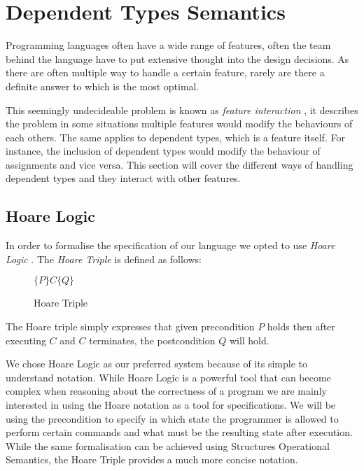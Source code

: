 \documentclass[a4paper,12pt]{report}
\begin{document}
\section{Dependent Types Semantics}
Programming languages often have a wide range of features, often the team behind 
the language have to put extensive thought into the design decisions. As there 
are often multiple way to handle a certain feature, rarely are there a definite 
answer to which is the most optimal.

\par
This seemingly undecideable problem is known as \textit{feature interaction} 
\cite{featInteract}, it describes the problem in some situations multiple 
features would modify the behaviours of each others. The same applies to 
dependent types, which is a feature itself. For instance, the inclusion of dependent types 
would modify the behaviour of assignments and vice versa. This section 
will cover the different ways of handling dependent types and they interact with 
other features.

\subsection{Hoare Logic}
In order to formalise the specification of our language we opted to use 
\textit{Hoare Logic} \cite{hoare}. The \textit{Hoare Triple} is defined as follows: 

\begin{figure}[H]
  \begin{center}
    $\{P\}C\{Q\}$
  \end{center}
  \caption{Hoare Triple}
\end{figure}
The Hoare triple simply expresses that given precondition $P$ holds then after executing $C$ 
and $C$ terminates, the postcondition $Q$ will hold.

\par
We chose Hoare Logic as our preferred system because of its simple to understand 
notation. While Hoare Logic is a powerful tool that can become complex when 
reasoning about the correctness of a program we are mainly interested in using 
the Hoare notation as a tool for specifications. We will be using the 
precondition to specify in which state the programmer is allowed to perform 
certain commands and what must be the resulting state after execution. While the 
same formalisation can be achieved using Structures Operational Semantics, the 
Hoare Triple provides a much more concise notation. 
\end{document}
